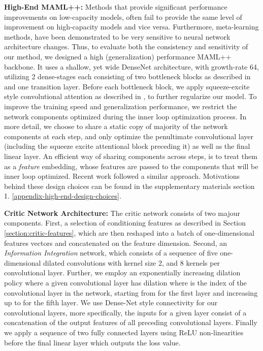 \documentclass{article} \usepackage[dvipsnames]{xcolor}
\begin{document}
\textbf{High-End MAML++:}
Methods that provide significant performance improvements on low-capacity models, often fail to provide the same level of improvement on high-capacity models and vice versa. Furthermore, meta-learning methods, have been demonstrated to be very sensitive to neural network architecture changes. Thus, to evaluate both the consistency and sensitivity of our method, we designed a high (generalization) performance MAML++ backbone. It uses a shallow, yet wide DenseNet architecture, with growth-rate 64, utilizing 2 dense-stages each consisting of two bottleneck blocks as described in \cite{huang2017densely} and one transition layer. Before each bottleneck block, we apply squeeze-excite style convolutional attention as described in \cite{hu2018squeeze}, to further regularize our model. To improve the training speed and generalization performance, we restrict the network components optimized during the inner loop optimization process. In more detail, we choose to share a static copy of majority of the network components at each step, and only optimize the penultimate convolutional layer (including the squeeze excite attentional block preceding it) as well as the final linear layer. An efficient way of sharing components across steps, is to treat them as a \emph{feature} embedding, whose features are passed to the components that will be inner loop optimized. Recent work \citep{rusu2018meta,qiao2018few} followed a similar approach. Motivations behind these design choices can be found in the supplementary materials section 1. \ref{appendix-high-end-design-choices}.

\textbf{Critic Network Architecture:}
The critic network consists of two majour components. First, a selection of conditioning features as described in Section \ref{section:critic-features}, which are then reshaped into a batch of one-dimensional features vectors and concatenated on the feature dimension. Second, an \emph{Information Integration} network, which consists of a sequence of five one-dimensional dilated convolutions with kernel size 2, and 8 kernels per convolutional layer. Further, we employ an exponentially increasing dilation policy where a given convolutional layer has dilation  where  is the index of the convolutional layer in the network, starting from  for the first layer and increasing up to  for the fifth layer. We use Dense-Net style connectivity for our convolutional layers, more specifically, the inputs for a given layer consist of a concatenation of the output features of all preceding convolutional layers. Finally we apply a sequence of two fully connected layers using ReLU non-linearities before the final linear layer which outputs the loss value.
\end{document}
